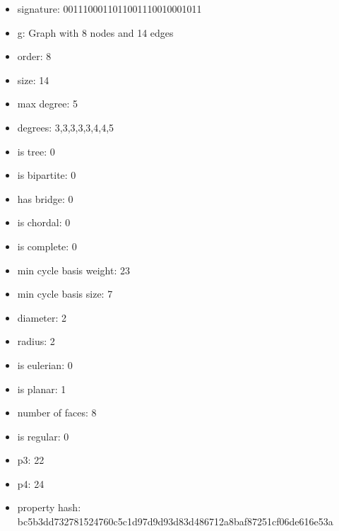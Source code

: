 \begin{itemize}
\item signature: 0011100011011001110010001011
\item g: Graph with 8 nodes and 14 edges
\item order: 8
\item size: 14
\item max degree: 5
\item degrees: 3,3,3,3,3,4,4,5
\item is tree: 0
\item is bipartite: 0
\item has bridge: 0
\item is chordal: 0
\item is complete: 0
\item min cycle basis weight: 23
\item min cycle basis size: 7
\item diameter: 2
\item radius: 2
\item is eulerian: 0
\item is planar: 1
\item number of faces: 8
\item is regular: 0
\item p3: 22
\item p4: 24
\item property hash: bc5b3dd732781524760c5c1d97d9d93d83d486712a8baf87251cf06de616e53a
\end{itemize}
\newpage
\begin{figure}
\end{figure}

